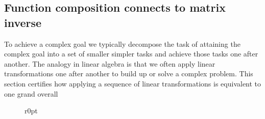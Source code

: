 \subsection{Function composition connects to matrix inverse}

To achieve a complex goal we typically decompose the task of attaining the complex goal into a set of smaller simpler tasks and achieve those tasks one after another.
The analogy in linear algebra is that we often apply linear transformations one after another to build up or solve a complex problem.
This section certifies how applying a sequence of linear transformations is equivalent to one grand overall 


\begin{figure}r{0pt}
\end{figure}
